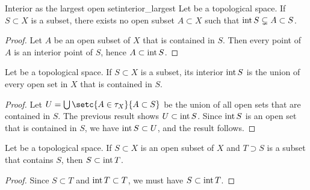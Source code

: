 \begin{theorem}{Interior as the largest open set}{interior_largest}
    Let  be a topological space. If \(S \subset X\) is a subset, there exists no open subset \(A \subset X\) such that \(\operatorname{int} S \subsetneq A \subset S\).
\end{theorem}
\begin{proof}
    Let \(A\) be an open subset of \(X\) that is contained in \(S\). Then every point of \(A\) is an interior point of \(S\), hence \(A \subset \operatorname{int} S\).
\end{proof}
\begin{corollary}
    Let  be a topological space. If \(S \subset X\) is a subset, its interior \(\operatorname{int} S\) is the union of every open set in \(X\) that is contained in \(S\).
\end{corollary}
\begin{proof}
    Let \(U = \bigcup\setc{A \in \tau_X}{A \subset S}\) be the union of all open sets that are contained in \(S\). The previous result shows \(U \subset \operatorname{int} S\). Since \(\operatorname{int} S\) is an open set that is contained in \(S\), we have \(\operatorname{int} S \subset U\), and the result follows.
\end{proof}
\begin{corollary}
    Let  be a topological space. If \(S \subset X\) is an open subset of \(X\) and \(T \supset S\) is a subset that contains \(S\), then \(S \subset \operatorname{int}{T}\).
\end{corollary}
\begin{proof}
    Since \(S \subset T\) and \(\operatorname{int} T \subset T\), we must have \(S \subset \operatorname{int}{T}\).
\end{proof}

